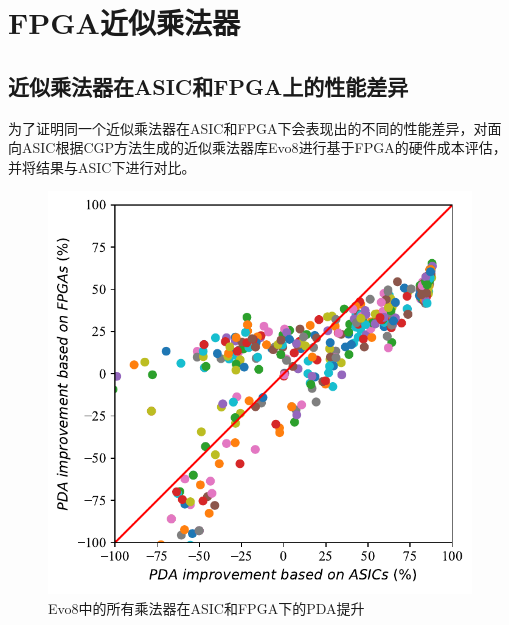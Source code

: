 \chapter{FPGA近似乘法器}


\section{近似乘法器在ASIC和FPGA上的性能差异}

为了证明同一个近似乘法器在ASIC和FPGA下会表现出的不同的性能差异，对面向ASIC根据CGP方法生成的近似乘法器库Evo8\cite{AC:AM:CGP_Evoapprox8b}进行基于FPGA的硬件成本评估，并将结果与ASIC下进行对比。

\begin{figure}[!ht]
    \centering
    \includegraphics[width=0.7\linewidth]{./figs/AC-AM-AMG-Evo8_ASIC_FPGA.pdf}
    \caption{Evo8中的所有乘法器在ASIC和FPGA下的PDA提升}
    \label{AC:AM:AMG:Fig:Evo8_ASIC_FPGA.pdf}
\end{figure}

